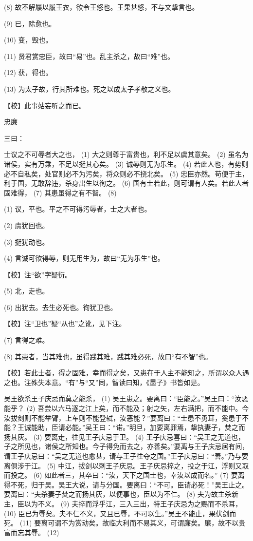 \documentclass[12pt,UTF8]{ctexbook}
\begin{document}
(8) 故不解屦以履王衣，欲令王怒也。王果甚怒，不与文挚言也。

(9) 已，除愈也。

(10) 变，毁也。

(11) 贤君赏忠臣，故曰“易”也。乱主杀之，故曰“难”也。

(12) 获，得也。

(13) 为太子故，行其所难也。死之以成太子孝敬之义也。

【校】此事姑妄听之而已。





忠廉


三曰：

士议之不可辱者大之也， (1) 大之则尊于富贵也，利不足以虞其意矣。 (2) 虽名为诸侯，实有万乘，不足以挺其心矣。 (3) 诚辱则无为乐生。 (4) 若此人也，有势则必不自私矣，处官则必不为污矣，将众则必不挠北矣。 (5) 忠臣亦然。苟便于主，利于国，无敢辞违，杀身出生以徇之。 (6) 国有士若此，则可谓有人矣。若此人者固难得， (7) 其患虽得之有不智。 (8)

(1) 议，平也。平之不可得污辱者，士之大者也。

(2) 虞犹回也。

(3) 挺犹动也。

(4) 言诚可欲得辱，则无用生为，故曰“无为乐生”也。

【校】注“欲”字疑衍。

(5) 北，走也。

(6) 出犹去。去生必死也。徇犹卫也。

【校】注“卫也”疑“从也”之讹，见下注。

(7) 言得之难。

(8) 其患者，当其难也，虽得践其难，践其难必死，故曰“有不智”也。

【校】若此士者，得之固难，幸而得之矣，又患在于人主不能知之，所谓以众人遇之也。注殊失本意。“有”与“又”同，智读曰知，《墨子》书皆如是。

吴王欲杀王子庆忌而莫之能杀， (1) 吴王患之。要离曰：“臣能之。”吴王曰：“汝恶能乎？ (2) 吾尝以六马逐之江上矣，而不能及；射之矢，左右满把，而不能中。今汝拔剑则不能举臂，上车则不能登轼，汝恶能？”要离曰：“士患不勇耳，奚患于不能？王诚能助，臣请必能。”吴王曰：“诺。”明旦，加要离罪焉，挚执妻子，焚之而扬其灰。 (3) 要离走，往见王子庆忌于卫。 (4) 王子庆忌喜曰：“吴王之无道也，子之所见也，诸侯之所知也。今子得免而去之，亦善矣。”要离与王子庆忌居有间，谓王子庆忌曰：“吴之无道也愈甚，请与王子往夺之国。”王子庆忌曰：“善。”乃与要离俱涉于江。 (5) 中江，拔剑以刺王子庆忌。王子庆忌捽之，投之于江，浮则又取而投之。 (6) 如此者三，其卒曰：“汝，天下之国士也，幸汝以成而名。” (7) 要离得不死，归于吴。吴王大说，请与分国。要离曰：“不可。臣请必死！”吴王止之。要离曰：“夫杀妻子焚之而扬其灰，以便事也，臣以为不仁。 (8) 夫为故主杀新主，臣以为不义。 (9) 夫捽而浮乎江，三入三出，特王子庆忌为之赐而不杀耳， (10) 臣已为辱矣。夫不仁不义，又且已辱，不可以生。”吴王不能止，果伏剑而死。 (11) 要离可谓不为赏动矣。故临大利而不易其义，可谓廉矣。廉，故不以贵富而忘其辱。 (12)
\end{document}
